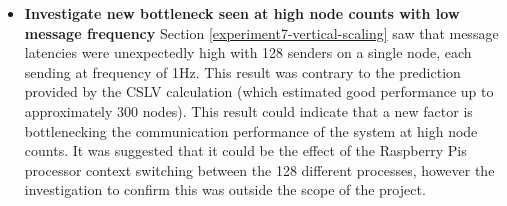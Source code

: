 \documentclass[../dissertation.tex]{subfiles}
\begin{document}
\begin{itemize}
  \item \textbf{Investigate new bottleneck seen at high node counts with low message frequency} Section \ref{experiment7-vertical-scaling} saw that message latencies were unexpectedly high with 128 senders on a single node, each sending at frequency of 1Hz. This result was contrary to the prediction provided by the CSLV calculation (which estimated good performance up to approximately 300 nodes). This result could indicate that a new factor is bottlenecking the communication performance of the system at high node counts. It was suggested that it could be the effect of the Raspberry Pis processor context switching between the 128 different processes, however the investigation to confirm this was outside the scope of the project.

\end{itemize}
\end{document}
